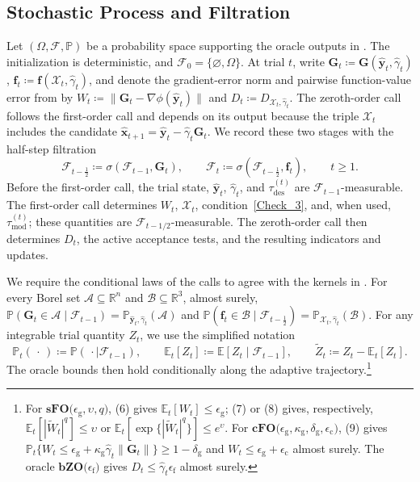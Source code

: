 \documentclass{article}
\begin{document}
\subsection{Stochastic Process and Filtration}
\label{subsection_3.1}
Let \((\Omega,\mathcal F,\mathbb P)\) be a probability space supporting
the oracle outputs in . The initialization is deterministic, and $\mathcal F_0=\{\varnothing,\Omega\}$. At trial \(t\), write
$\mathbf{G}_t\coloneqq \mathbf{G}(\hat {\bm{y}}_t,\hat\gamma_t)$,
$\mathbf{f}_t\coloneqq \mathbf{f}(\mathcal X_t,\hat\gamma_t)$, and denote the gradient-error norm and pairwise function-value error from
 by
$W_t\coloneqq \|\mathbf{G}_t-\nabla\phi(\hat {\bm{y}}_t)\|$ and 
$D_t\coloneqq D_{\mathcal X_t,\hat\gamma_t}$.
The zeroth-order call follows the first-order call and depends on its output because the triple $\mathcal X_t$ includes the candidate $\hat{\bm{x}}_{t+1}=\hat{\bm{y}}_t-\hat\gamma_t\mathbf{G}_t$. We record these two stages with the half-step filtration
\begin{equation}\label{eq:trial_filtration}
\mathcal F_{t-\frac12}
\coloneqq 
\sigma(\mathcal F_{t-1},\mathbf{G}_t),
\qquad
\mathcal F_t
\coloneqq 
\sigma(\mathcal F_{t-\frac12},\mathbf{f}_t),
\qquad t\ge1.
\end{equation}
Before the first-order call, the trial state, $\hat{\bm{y}}_t$, $\hat\gamma_t$, and $\tau_{\mathrm{des}}^{(t)}$ are $\mathcal F_{t-1}$-measurable. The first-order call determines $W_t$, $\mathcal X_t$, condition~\eqref{Check_3}, and, when used, $\tau_{\mathrm{mod}}^{(t)}$; these quantities are $\mathcal F_{t-1/2}$-measurable. The zeroth-order call then determines $D_t$, the active acceptance tests, and the resulting indicators and updates.

We require the conditional laws of the calls to agree with the kernels in 
.  For every Borel set $\mathcal{A}\subseteq\mathbb R^n$ and $\mathcal{B}\subseteq\mathbb R^3$, almost surely,
$\mathbb P(\mathbf{G}_t\in \mathcal{A}\mid\mathcal F_{t-1})
=\mathbb P_{\hat {\bm{y}}_t,\hat\gamma_t}(\mathcal{A})$ and  $\mathbb P(\mathbf{f}_t\in \mathcal{B}\mid\mathcal F_{t-\frac12})
=\mathbb P_{\mathcal X_t,\hat\gamma_t}(\mathcal{B})$. 
For any integrable trial quantity \(Z_t\), we use the simplified notation
\[
\mathbb P_t(\,\cdot\,)
\coloneqq 
\mathbb P(\,\cdot\mid\mathcal F_{t-1}),
\qquad
\mathbb E_t[Z_t]
\coloneqq 
\mathbb E[Z_t\mid\mathcal F_{t-1}],
\qquad
\widetilde Z_t
\coloneqq 
Z_t-\mathbb E_t[Z_t].
\]
The oracle bounds then hold conditionally along the adaptive
trajectory.\footnote{For \(\textbf{sFO(}\epsilon_{\mathrm g},\upsilon,q\textbf{)}\), (6) gives \(\mathbb E_t[W_t]\le\epsilon_{\mathrm g}\); (7) or (8) gives, respectively, \(\mathbb E_t[|\widetilde W_t|^q]\le\upsilon\) or \(\mathbb E_t[\exp\{|\widetilde W_t|^q\}]\le e^\upsilon\). For \(\textbf{cFO(}\epsilon_{\mathrm g},\kappa_{\mathrm g},\delta_{\mathrm g},\epsilon_{\mathrm c}\textbf{)}\), (9) gives \(\mathbb P_t\{W_t\le\epsilon_{\mathrm g}+\kappa_{\mathrm g}\hat\gamma_t\|\mathbf G_t\|\}\ge1-\delta_{\mathrm g}\) and \(W_t\le\epsilon_{\mathrm g}+\epsilon_{\mathrm c}\) almost surely. The oracle \(\textbf{bZO(}\epsilon_{\mathrm f}\textbf{)}\) gives \(D_t\le\hat\gamma_t\epsilon_{\mathrm f}\) almost surely.} 
\end{document}
